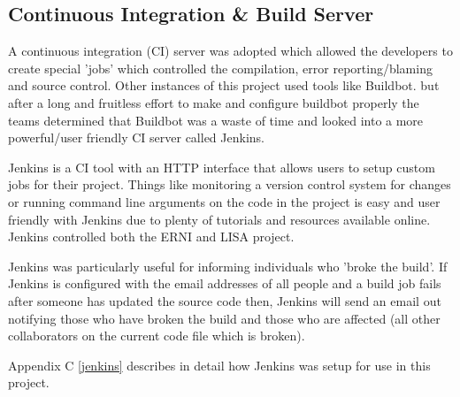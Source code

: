 \subsection{Continuous Integration \& Build Server}

A continuous integration (CI) server was adopted which allowed the developers to create special 'jobs' which  controlled the compilation, error reporting/blaming and source control. Other instances of this project used tools like Buildbot\cite{buildbotsite}. but after a long and fruitless effort to make and configure buildbot properly the teams determined that Buildbot was a waste of time and looked into a more powerful/user friendly CI server called Jenkins\cite{jenkinssite}.

Jenkins is a CI tool with an HTTP interface that allows users to setup custom jobs for their project. Things like monitoring a version control system for changes or running command line arguments on the code in the project is easy and user friendly with Jenkins due to plenty of tutorials and resources available online. Jenkins controlled both the ERNI and LISA project. 

Jenkins was particularly useful for informing individuals who 'broke the build'. If Jenkins is configured with the email addresses of all people and a build job fails after someone has updated the source code then, Jenkins will send an email out notifying those who have broken the build and those who are affected (all other collaborators on the current code file which is broken).

Appendix C \ref{jenkins} describes in detail how Jenkins was setup for use in this project.
